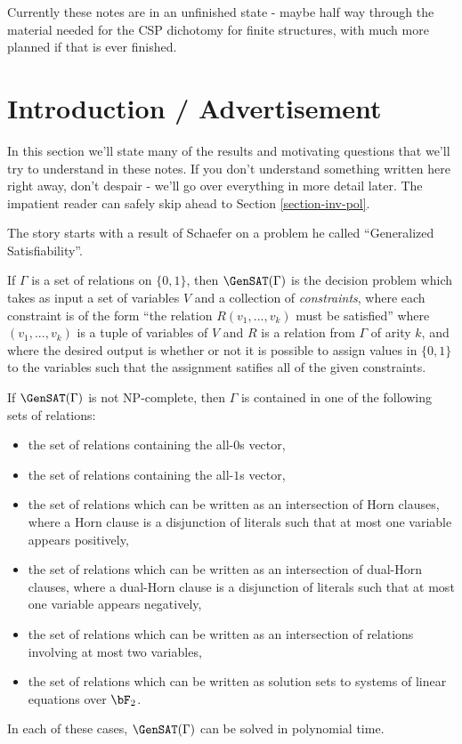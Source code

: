 Currently these notes are in an unfinished state - maybe half way through the material needed for the CSP dichotomy for finite structures, with much more planned if that is ever finished.


\section{Introduction / Advertisement}

In this section we'll state many of the results and motivating questions that we'll try to understand in these notes. If you don't understand something written here right away, don't despair - we'll go over everything in more detail later. The impatient reader can safely skip ahead to Section \ref{section-inv-pol}.

The story starts with a result of Schaefer \cite{schaefer} on a problem he called ``Generalized Satisfiability''.

\begin{defn} If $\Gamma$ is a set of relations on $\{0,1\}$, then $\GenSAT(\Gamma)$ is the decision problem which takes as input a set of variables $V$ and a collection of \emph{constraints}, where each constraint is of the form ``the relation $R(v_1, ..., v_k)$ must be satisfied'' where $(v_1, ..., v_k)$ is a tuple of variables of $V$ and $R$ is a relation from $\Gamma$ of arity $k$, and where the desired output is whether or not it is possible to assign values in $\{0,1\}$ to the variables such that the assignment satifies all of the given constraints.
\end{defn}

\begin{thm} If $\GenSAT(\Gamma)$ is not NP-complete, then $\Gamma$ is contained in one of the following sets of relations:
\begin{itemize}
\item the set of relations containing the all-$0$s vector,

\item the set of relations containing the all-$1$s vector,

\item the set of relations which can be written as an intersection of Horn clauses, where a Horn clause is a disjunction of literals such that at most one variable appears positively,

\item the set of relations which can be written as an intersection of dual-Horn clauses, where a dual-Horn clause is a disjunction of literals such that at most one variable appears negatively,

\item the set of relations which can be written as an intersection of relations involving at most two variables,

\item the set of relations which can be written as solution sets to systems of linear equations over $\bF_2$.
\end{itemize}
In each of these cases, $\GenSAT(\Gamma)$ can be solved in polynomial time.
\end{thm}

